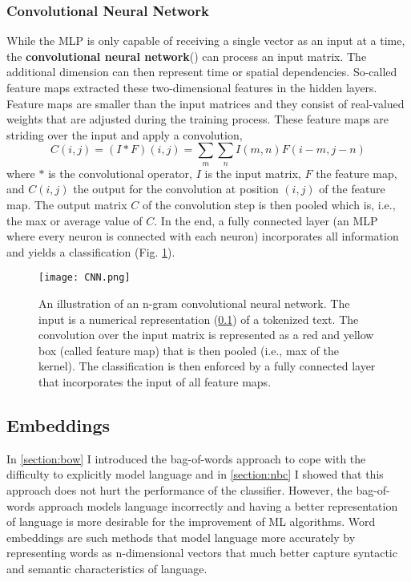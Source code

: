\subsubsection{Convolutional Neural Network}
While the MLP is only capable of receiving a single vector as an input at a time, the \textbf{convolutional neural network}() can process an input matrix. The additional dimension can then represent time or spatial dependencies. So-called feature maps extracted these two-dimensional features in the hidden layers. Feature maps are smaller than the input matrices and they consist of real-valued weights that are adjusted during the training process. These feature maps are striding over the input and apply a convolution,
\[C(i,j) = (I \ast F)(i,j) = \sum_m \sum_n I(m, n) F(i-m, j-n)\] where $\ast$ is the convolutional operator, $I$ is the input matrix, $F$ the feature map, and $C(i,j)$ the output for the convolution at position $(i,j)$ of the feature map. The output matrix $C$ of the convolution step is then pooled which is, i.e., the max or average value of $C$. In the end, a fully connected layer (an MLP where every neuron is connected with each neuron) incorporates all information and yields a classification (Fig. \ref{fig:cnn}).
\begin{figure}[h!]
    \centering
    \texttt{[image: CNN.png]}
    \caption{An illustration of an n-gram convolutional neural network. The input is a numerical representation (\ref{section:embeddings}) of a tokenized text. The convolution over the input matrix is represented as a red and yellow box (called feature map) that is then pooled (i.e., max of the kernel). The classification is then enforced by a fully connected layer that incorporates the input of all feature maps.}
    \label{fig:cnn}
\end{figure}

\subsection{Embeddings}\label{section:embeddings}

In \ref{section:bow} I introduced the bag-of-words approach to cope with the difficulty to explicitly model language and in \ref{section:nbc} I showed that this approach does not hurt the performance of the classifier. However, the bag-of-words approach models language incorrectly and having a better representation of language is more desirable for the improvement of ML algorithms. Word embeddings are such methods that model language more accurately by representing words as n-dimensional vectors that much better capture syntactic and semantic characteristics of language.

